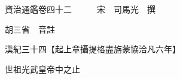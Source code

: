 










 


 
 


 

  
  
  
  
  





  
  
  
  
  
 
  

  

  
  
  



  

 
 

  
   




  

  
  


  　　資治通鑑卷四十二　　　宋　司馬光　撰

　　胡三省　音註

　　漢紀三十四【起上章攝提格盡旃蒙協洽凡六年】

　　世祖光武皇帝中之止

